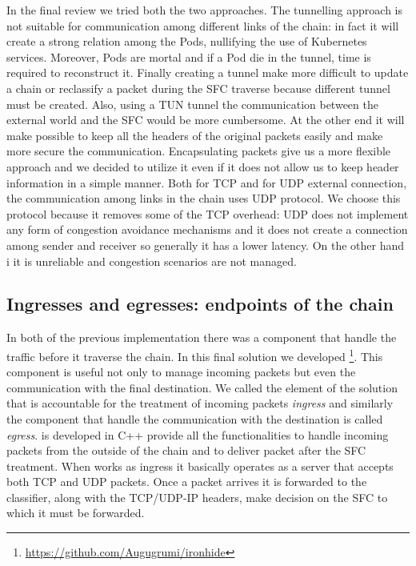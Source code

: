 \vspace*{1cm}

\noindent In the final review we tried both the two approaches. The tunnelling
approach is not suitable for communication among different links of the chain:
in fact it will create a strong relation among the Pods, nullifying the use of
Kubernetes services. Moreover, Pods are mortal and if a Pod die in the tunnel,
time is required to reconstruct it. Finally creating a tunnel make more
difficult to update a chain or reclassify a packet during the SFC traverse
because different tunnel must be created. Also, using a TUN tunnel the
communication between the external world and the SFC would be more cumbersome.
At the other end it will make possible to keep all the headers of the original
packets easily and make more secure the communication. Encapsulating packets
give us a more flexible approach and we decided to utilize it even if it does
not allow us to keep header information in a simple manner. Both for TCP and for
UDP external connection, the communication among links in the chain uses UDP
protocol. We choose this protocol because it removes some of the TCP overhead:
UDP does not implement any form of congestion avoidance mechanisms and it does
not create a connection among sender and receiver so generally it has a lower
latency. On the other hand i it is unreliable and congestion scenarios are not
managed.

\subsection{Ingresses and egresses: endpoints of the chain}
In both of the previous implementation there was a component that handle the
traffic before it traverse the chain. In this final solution we developed 
\ironhide{}\footnote{\url{https://github.com/Augugrumi/ironhide}}. This
component is useful not only to manage incoming packets but even the
communication with the final destination. We called the element of the solution
that is accountable for the treatment of incoming packets \emph{ingress} and
similarly the component that handle the communication with the destination is
called \emph{egress}. \ironhide{} is developed in C++ provide all the
functionalities to handle incoming packets from the outside of the chain and to
deliver packet after the SFC treatment. When \ironhide{} works as ingress it
basically operates as a server that accepts both TCP and UDP packets. Once a
packet arrives it is forwarded to the classifier, along with the TCP/UDP-IP
headers, make decision on the SFC to which it must be forwarded.

